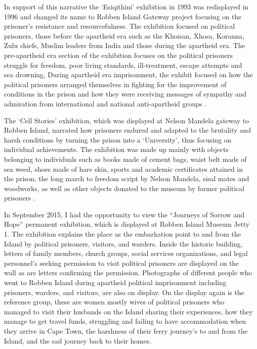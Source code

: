 In support of this narrative the ‘Esiqithini’ exhibition in 1993 was redisplayed in 1996 and changed its name to Robben Island Gateway project focusing on the prisoner’s resistance and resourcefulness. The exhibition focused on political prisoners, those before the apartheid era such as the Khoisan, Xhosa, Koranna, Zulu chiefs, Muslim leaders from India and those during the apartheid era. The pre-apartheid era section of the exhibition focuses on the political prisoners struggle for freedom, poor living standards, ill-treatment, escape attempts and sea drowning, During apartheid era imprisonment, the exhibit focused on how the political prisoners arranged themselves in fighting for the improvement of conditions in the prison and how they were receiving messages of sympathy and admiration from international and national anti-apartheid groups \parencite{Nesje_2005}.

The ‘Cell Stories’ exhibition, which was displayed at Nelson Mandela gateway to Robben Island, narrated how prisoners endured and adapted to the brutality and harsh conditions by turning the prison into a ‘University’, thus focusing on individual achievements. The exhibition was made up mainly with objects belonging to individuals such as books made of cement bags, waist belt made of sea weed, shoes made of hare skin, sports and academic certificates attained in the prison, the long march to freedom script by Nelson Mandela, sisal mates and woodworks, as well as other objects donated to the museum by former political prisoners \parencite{Rioufol_1999}.

In September 2015, I had the opportunity to view the “Journeys of Sorrow and Hope” permanent exhibition, which is displayed at Robben Island Museum Jetty 1. The exhibition explains the place as the embarkation point to and from the Island by political prisoners, visitors, and warders. Inside the historic building, letters of family members, church groups, social services organizations, and legal personnel’s seeking permission to visit political prisoners are displayed on the wall as are letters confirming the permission. Photographs of different people who went to Robben Island during apartheid political imprisonment including prisoners, warders, and visitors, are also on display. On the display again is the reference group, these are women mostly wives of political prisoners who managed to visit their husbands on the Island sharing their experiences, how they manage to get travel funds, struggling and failing to have accommodation when they arrive in Cape Town, the harshness of their ferry journey’s to and from the Island, and the sad journey back to their homes.

